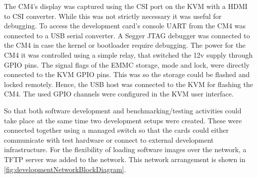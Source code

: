 The CM4's display was captured using the CSI port on the KVM with a HDMI to CSI converter. While this was not strictly necessary it was useful for debugging. To access the development card's console UART from the CM4 was connected to a USB serial converter. A Segger JTAG debugger was connected to the CM4 in case the kernel or bootloader require debugging. The power for the CM4 it was controlled using a simple relay, that switched the 12v supply through GPIO pins. The signal flags of the EMMC storage, mode and lock, were directly connected to the KVM GPIO pins. This was so the storage could be flashed and locked remotely. Hence, the USB host was connected to the KVM for flashing the CM4. The used GPIO channels were configured in the KVM user interface.

\clearpage

So that both software development and benchmarking/testing activities could take place at the same time two development setups were created. These were connected together using a managed switch so that the cards could either communicate with test hardware or connect to external development infrastructure. For the flexibility of loading software images over the network, a TFTP server was added to the network. This network arrangement is shown in \autoref{fig:developmentNetworkBlockDiagram}.

